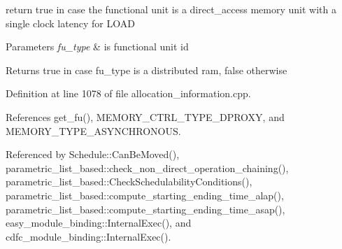 return true in case the functional unit is a direct\+\_\+access memory unit with a single clock latency for L\+O\+AD 


\begin{DoxyParams}{Parameters}
{\em fu\+\_\+type} & is functional unit id \\
\hline
\end{DoxyParams}
\begin{DoxyReturn}{Returns}
true in case fu\+\_\+type is a distributed ram, false otherwise 
\end{DoxyReturn}


Definition at line 1078 of file allocation\+\_\+information.\+cpp.



References get\+\_\+fu(), M\+E\+M\+O\+R\+Y\+\_\+\+C\+T\+R\+L\+\_\+\+T\+Y\+P\+E\+\_\+\+D\+P\+R\+O\+XY, and M\+E\+M\+O\+R\+Y\+\_\+\+T\+Y\+P\+E\+\_\+\+A\+S\+Y\+N\+C\+H\+R\+O\+N\+O\+US.



Referenced by Schedule\+::\+Can\+Be\+Moved(), parametric\+\_\+list\+\_\+based\+::check\+\_\+non\+\_\+direct\+\_\+operation\+\_\+chaining(), parametric\+\_\+list\+\_\+based\+::\+Check\+Schedulability\+Conditions(), parametric\+\_\+list\+\_\+based\+::compute\+\_\+starting\+\_\+ending\+\_\+time\+\_\+alap(), parametric\+\_\+list\+\_\+based\+::compute\+\_\+starting\+\_\+ending\+\_\+time\+\_\+asap(), easy\+\_\+module\+\_\+binding\+::\+Internal\+Exec(), and cdfc\+\_\+module\+\_\+binding\+::\+Internal\+Exec().

